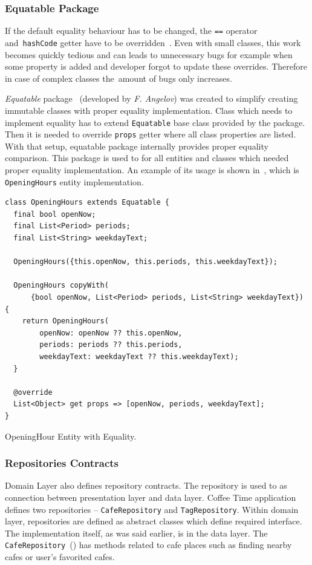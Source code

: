 \subsubsection{Equatable Package}
If the default equality behaviour has to be changed, the \verb|==| operator and~\verb|hashCode| getter have to be overridden~\cite{dart-equality}.
Even with small classes, this work becomes quickly tedious and can leads to unnecessary bugs for example when some property is added and developer forgot to update these overrides. Therefore in case of complex classes the~amount of bugs only increases. 

\textit{Equatable} package~\cite{package-equatable} (developed by \textit{F. Angelov}) was created to simplify creating immutable classes with proper equality implementation. Class which needs to implement equality has to extend \verb|Equatable| base class provided by the package. Then it is needed to override \verb|props| getter where all class properties are listed. With that setup, equatable package internally provides proper equality comparison. This package is used to for all entities and classes which needed proper equality implementation. An example of its usage is shown in~, which is \verb|OpeningHours| entity implementation. 

\begin{listing}[ht]
\begin{verbatim}
class OpeningHours extends Equatable {
  final bool openNow;
  final List<Period> periods;
  final List<String> weekdayText;

  OpeningHours({this.openNow, this.periods, this.weekdayText});

  OpeningHours copyWith(
      {bool openNow, List<Period> periods, List<String> weekdayText}) {
    return OpeningHours(
        openNow: openNow ?? this.openNow,
        periods: periods ?? this.periods,
        weekdayText: weekdayText ?? this.weekdayText);
  }

  @override
  List<Object> get props => [openNow, periods, weekdayText];
}
\end{verbatim}
\caption{OpeningHour Entity with Equality.}
\label{listing:ct-opening-hour-entity}
\end{listing}

\subsubsection{Repositories Contracts}
Domain Layer also defines repository contracts. The repository is used to as connection between presentation layer and data layer. Coffee Time application defines two repositories -- \verb|CafeRepository| and \verb|TagRepository|. Within domain layer, repositories are defined as abstract classes which define required interface. The implementation itself, as was said earlier, is in the data layer. The \verb|CafeRepository|~() has methods related to cafe places such as finding nearby cafes or user's favorited cafes. 

